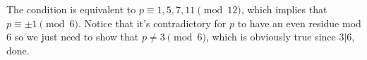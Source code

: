 The condition is equivalent to $p\equiv 1,5,7,11\pmod{12}$, which
implies that $p\equiv \pm 1 \pmod{6}$. Notice that it's contradictory for $p$ to have an even residue mod $6$ so we
just need to show that $p\ne 3\pmod{6}$, which is obviously true since $3|6$, done.
